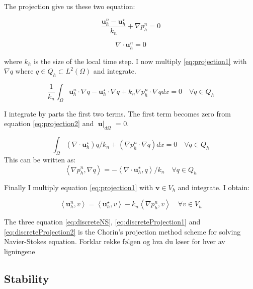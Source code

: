 \documentclass[12pt,a4paper,english]{article}
\begin{document}
The projection give us these two equation:


\begin{equation}
\frac{\textbf{u}^{n}_{h} - \textbf{u}^{\star}_{h}}{k_n} + \nabla p^{n}_{h} = 0
\label{eq:projection1}
\end{equation}

\begin{equation}
\nabla \cdot \textbf{u}^{n}_{h} = 0
\label{eq:projection2}
\end{equation}

where $k_h$ is the size of the local time step. I now multiply \ref{eq:projection1} with $\nabla q$ where $q \in Q_h \subset L^2\left(\Omega \right)$ and integrate. 

$$
\frac{1}{k_n} \int_{\Omega} \textbf{u}^{n}_{h} \cdot \nabla q - \textbf{u}^{\star}_{h} \cdot \nabla q + k_n \nabla p^{n}_{h} \cdot \nabla q dx = 0 \quad \forall q \in Q_h
$$

I integrate by parts the first two terms. The first term becomes zero from equation \ref{eq:projection2} and $\textbf{u}\mid_{d\Omega}$ = 0.

$$
\int_{\Omega} \left( \nabla \cdot \textbf{u}^{\star}_{h} \right)q/k_n + \left( \nabla p^{n}_{h} \cdot \nabla q\right)  dx = 0 \quad \forall q \in Q_h
$$ 
This can be written as:
\begin{equation}
\left\langle \nabla p^{n}_{h} , \nabla q\right\rangle  = - \left\langle \nabla \cdot \textbf{u}^{\star}_{h} , q \right\rangle /k_n \quad \forall q \in Q_h
\label{eq:discreteProjection1}
\end{equation}

Finally I multiply equation \ref{eq:projection1} with $\textbf{v} \in V_h$ and integrate. I obtain:

\begin{equation}
\left\langle  \textbf{u}^{n}_{h} , v \right\rangle = \left\langle  \textbf{u}^{\star}_{h} , v \right\rangle - k_n\left\langle \nabla p^{n}_{h} , v\right\rangle \quad \forall v \in V_h
\label{eq:discreteProjection2}
\end{equation}

The three equation \ref{eq:discreteNS}, \ref{eq:discreteProjection1} and \ref{eq:discreteProjection2} is the Chorin's projection method scheme for solving Navier-Stokes equation. Forklar rekke følgen og hva du løser for hver av ligningene


\subsection*{Stability}
\end{document}
